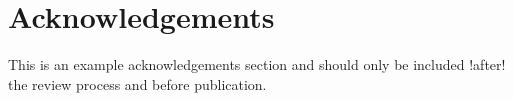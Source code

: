 \section*{Acknowledgements}

\noindent This is an example acknowledgements section and should only be included !after! the review process and before publication.

